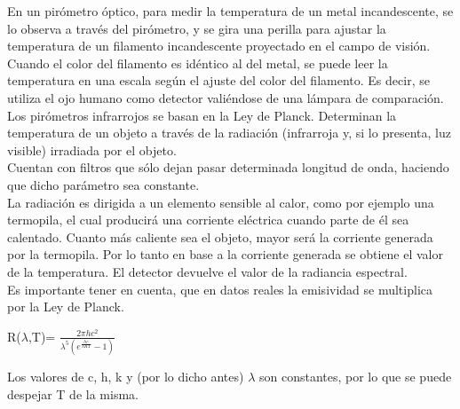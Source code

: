 \documentclass[10pt,a4paper]{article}
\begin{document}
\begin{enumerate}[a)]
En un pirómetro óptico, para medir la temperatura de un metal incandescente, se lo observa a través del pirómetro, y se gira una perilla para ajustar la temperatura de un filamento incandescente proyectado en el campo de visión. Cuando el color del filamento es idéntico al del metal, se puede leer la temperatura en una escala según el ajuste del color del filamento. Es decir, se utiliza el ojo humano como detector valiéndose de una lámpara de comparación.\\

Los pirómetros infrarrojos se basan en la Ley de Planck. Determinan la temperatura de un objeto a través de la radiación (infrarroja y, si lo presenta, luz visible) irradiada por el objeto.\\ 
Cuentan con filtros que sólo dejan pasar determinada longitud de onda, haciendo que dicho parámetro sea constante. \\
La radiación es dirigida a un elemento sensible al calor, como por ejemplo una termopila, el cual producirá una corriente eléctrica cuando parte de él sea calentado. Cuanto más caliente sea el objeto, mayor será la corriente generada por la termopila. Por lo tanto en base a la corriente generada se obtiene el valor de la temperatura. El detector devuelve el valor de la radiancia espectral.\\
Es importante tener en cuenta, que en datos reales la emisividad se multiplica por la Ley de Planck.

\begin{center}
R($\lambda$,T)= $\frac{2 \pi h c^2}{\lambda^5(e^\frac{hc}{\lambda K T} - 1)}$
\end{center}

Los valores de c, h, k y (por lo dicho antes) $\lambda$ son constantes, por lo que se puede despejar T de la misma.

\end{enumerate}

\newpage


\end{document}
